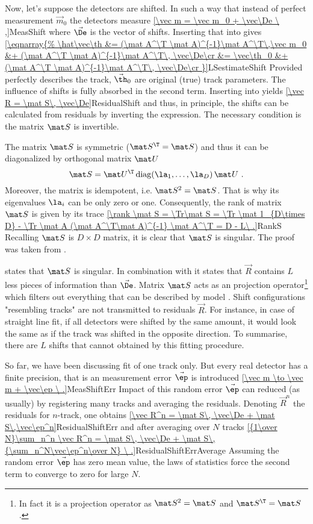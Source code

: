 Now, let's suppose the detectors are shifted. In such a way that instead of perfect measurement $\vec m_0$ the detectors measure
\eqref{\vec m = \vec m_0 + \vec\De \ ,}{MeasShift}
where $\vec\De$ is the vector of shifts. Inserting that into  gives
\eqref{\eqnarray{%
\hat\vec\th &= (\mat A^\T \mat A)^{-1}\mat A^\T\,\vec m_0 &+ (\mat A^\T \mat A)^{-1}\mat A^\T\, \vec\De\cr
			&= \vec\th_0 &+ (\mat A^\T \mat A)^{-1}\mat A^\T\, \vec\De\cr
}}{LSestimateShift}
Provided  perfectly describes the track, $\vec\th_0$ are original (true) track parameters. The influence of shifts is fully absorbed in the second term. Inserting  into  yields
\eqref{\vec R = \mat S\, \vec\De}{ResidualShift}
and thus, in principle, the shifts can be calculated from residuals by inverting the expression. The necessary condition is the matrix $\mat S$ is invertible. 

The matrix $\mat S$ is symmetric ($\mat S^\T = \mat S$) and thus it can be diagonalized by orthogonal matrix $\mat U$
$$\mat S = \mat U^\T\,{\rm diag}(\la_1,\ldots,\la_D)\,\mat U\ .$$
Moreover, the matrix is idempotent, i.e. $\mat S^2 = \mat S$. That is why its eigenvalues $\la_i$ can be only zero or one. Consequently, the rank of matrix $\mat S$ is given by its trace
\eqref{\rank \mat S = \Tr\mat S = \Tr \mat 1_{D\times D} - \Tr \mat A (\mat A^\T\mat A)^{-1} \mat A^\T = D - L\ .}{RankS}
Recalling $\mat S$ is $D\times D$ matrix, it is clear that $\mat S$ is singular. The proof was taken from .

 states that $\mat S$ is singular. In combination with  it states that $\vec R$ contains $L$ less pieces of information than $\vec \De$. Matrix $\mat S$ acts as an projection operator\footnote{%
In fact it is a projection operator as $\mat S^2 = \mat S$ and $\mat S^\T = \mat S$.
}
which filters out everything that can be described by model . Shift configurations "resembling tracks" are not transmitted to residuals $\vec R$. For instance, in case of straight line fit, if all detectors were shifted by the same amount, it would look the same as if the track was shifted in the opposite direction. To summarise, there are $L$ shifts that cannot obtained by this fitting procedure.

So far, we have been discussing fit of one track only. But every real detector has a finite precision, that is an measurement error $\vec\ep$ is introduced
\eqref{\vec m \to \vec m + \vec\ep \ .}{MeasShiftErr}
Impact of this random error $\vec\ep$ can reduced (as usually) by registering many tracks and averaging the residuals. Denoting $\vec R^n$ the residuals for $n$-track, one obtains
\eqref{\vec R^n = \mat S\, \vec\De + \mat S\,\vec\ep^n}{ResidualShiftErr}
and after averaging over $N$ tracks
\eqref{{1\over N}\sum_n^n \vec R^n = \mat S\, \vec\De + \mat S\,{\sum_n^N\vec\ep^n\over N} \ .}{ResidualShiftErrAverage}
Assuming the random error $\vec\ep$ has zero mean value, the laws of statistics force the second term to converge to zero for large $N$.


